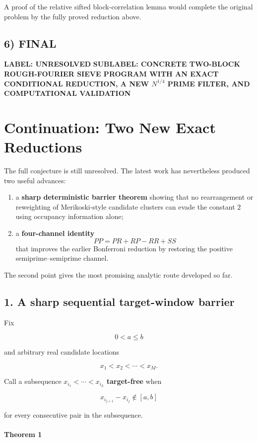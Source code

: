 A proof of the relative sifted block-correlation lemma would complete the original problem by the fully proved reduction above.

\subsection*{6) FINAL}

\textbf{LABEL: UNRESOLVED}
\textbf{SUBLABEL: CONCRETE TWO-BLOCK ROUGH-FOURIER SIEVE PROGRAM WITH AN EXACT CONDITIONAL REDUCTION, A NEW \(N^{1/4}\) PRIME FILTER, AND COMPUTATIONAL VALIDATION}

\medskip
\medskip

\section*{Continuation: Two New Exact Reductions}

The full conjecture is still unresolved. The latest work has nevertheless produced two useful advances:

\begin{enumerate}
\item a \textbf{sharp deterministic barrier theorem} showing that no rearrangement or reweighting of Merikoski-style candidate clusters can evade the constant \(2\) using occupancy information alone;
\item a \textbf{four-channel identity}
\[
PP=PR+RP-RR+SS
\]
that improves the earlier Bonferroni reduction by restoring the positive semiprime--semiprime channel.
\end{enumerate}

The second point gives the most promising analytic route developed so far.

\subsection*{1. A sharp sequential target-window barrier}

Fix

\[
0<a\le b
\]

and arbitrary real candidate locations

\[
x_1<x_2<\cdots<x_M.
\]

Call a subsequence \(x_{i_1}<\cdots<x_{i_L}\) \textbf{target-free} when

\[
x_{i_{j+1}}-x_{i_j}\notin[a,b]
\]

for every consecutive pair in the subsequence.

\paragraph{Theorem 1}

